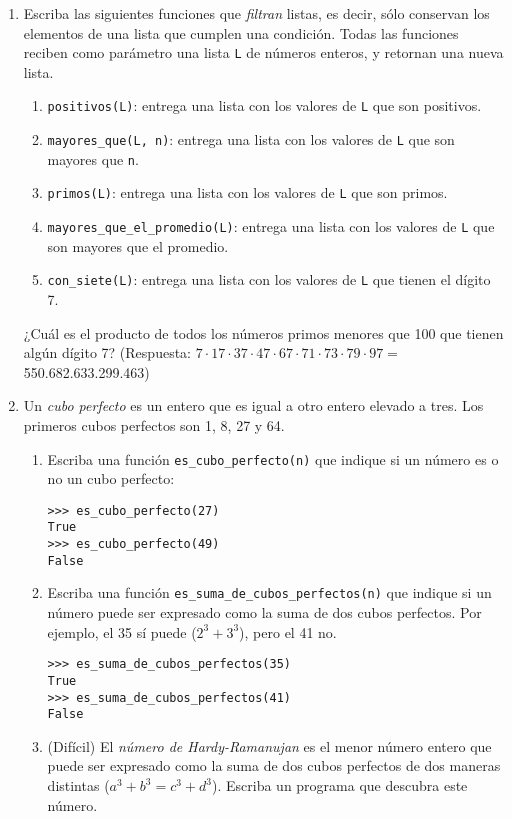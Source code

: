 \documentclass[10pt,spanish]{article}
\begin{document}
\begin{enumerate}
    \item
      Escriba las siguientes funciones que \emph{filtran} listas,
      es decir, sólo conservan los elementos de una lista
      que cumplen una condición.
      Todas las funciones reciben como parámetro una lista \verb+L+
      de números enteros, y retornan una nueva lista.
      \begin{enumerate}
        \item \lstinline!positivos(L)!: 
          entrega una lista con los valores de \verb+L+ que son positivos.
        \item \lstinline!mayores_que(L, n)!: 
          entrega una lista con los valores de \verb+L+ que son mayores que \verb+n+.
        \item \lstinline!primos(L)!:
          entrega una lista con los valores de \verb+L+ que son primos.
        \item \lstinline!mayores_que_el_promedio(L)!:
          entrega una lista con los valores de \verb+L+
          que son mayores que el promedio.
        \item \lstinline!con_siete(L)!:
          entrega una lista con los valores de \verb+L+
          que tienen el dígito 7.
      \end{enumerate}
      ¿Cuál es el producto de todos los números primos menores que 100
      que tienen algún dígito 7? (Respuesta: \(
      7\cdot 17\cdot 37\cdot 47\cdot 67\cdot 71\cdot 73\cdot 79\cdot 97
      =\) 550.682.633.299.463)

    \item
      Un \emph{cubo perfecto} es un entero
      que es igual a otro entero elevado a tres.
      Los primeros cubos perfectos son 1, 8, 27 y 64.
      \begin{enumerate}
        \item Escriba una función \lstinline!es_cubo_perfecto(n)!
          que indique si un número es o no un cubo perfecto:
\begin{lstlisting}
>>> es_cubo_perfecto(27)
True
>>> es_cubo_perfecto(49)
False
\end{lstlisting}
        \item Escriba una función \lstinline!es_suma_de_cubos_perfectos(n)!
          que indique si un número puede ser expresado
          como la suma de dos cubos perfectos.
          Por ejemplo, el 35 sí puede (\(2^3 + 3^3\)),
          pero el 41 no.
\begin{lstlisting}
>>> es_suma_de_cubos_perfectos(35)
True
>>> es_suma_de_cubos_perfectos(41)
False
\end{lstlisting}
        \item (Difícil) El \emph{número de Hardy-Ramanujan}
          es el menor número entero que puede ser expresado
          como la suma de dos cubos perfectos
          de dos maneras distintas (\(a^3 + b^3 = c^3 + d^3\)).
          Escriba un programa que descubra este número.
      \end{enumerate}


\end{enumerate}
\end{document}
